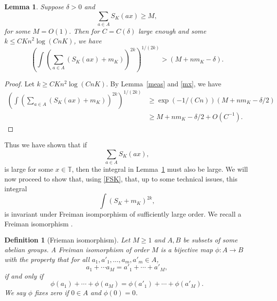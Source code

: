 \documentclass[12pt,reqno]{amsart}
\theoremstyle{dotless}
\newtheorem{lemma}{Lemma}
\newtheorem{defn}{Definition}
\begin{document}
\begin{lemma}\label{intSK} Suppose $\delta > 0$ and
$$\sum_{a \in A} S_K(ax) \geq M,$$
for some $M = O(1)$. Then for $C = C(\delta)$ large enough and some $k \leq  C Kn^2\log(CnK)$, we have $$ \left( \int \left( \sum_{a\in A} (S_K(ax) + m_K)\right)^{2k} \right)^{1/(2k)}  >  (M+nm_K-\delta).$$
\end{lemma}

\begin{proof}
Let $k \geq C Kn^2\log(CnK)$. By Lemma~\ref{meas} and \eqref{mx}, we have
\begin{align*} \label{int} \left( \int \left( \sum_{a\in A} (S_K(ax) + m_K)\right)^{2k} \right)^{1/(2k)} & \geq \exp(-1/(Cn)) (M + nm_K- \delta/2 ) \\
&\geq M+ nm_K-  \delta /2+ O(C^{-1}).\end{align*} 
\end{proof}


Thus we have shown that if 
$$\sum_{a \in A} S_K(ax),$$ is large for some $x \in \mathbb{T}$, then the integral in Lemma~\ref{intSK} must also be large. We will now proceed to show that, using \eqref{FSK}, that, up to some technical issues, this integral
$$\int (S_K +m_K)^{2k},$$ is invariant under Freiman isomporphism of sufficiently large order. We recall a Freiman isomorphism \cite[Definition 5.2.1]{TV}.
\begin{defn}[Frieman isomorphism] Let $M \geq 1$ and $A ,B$ be subsets of some abelian groups. A Freiman isomorphism of order $M$ is a bijective map $\phi : A \to B$ with the property that for all $a_1,a'_1 , \ldots ,a_m ,a'_m\in A$,
$$a_1 + \cdots a_M = a'_1 + \cdots + a'_M,$$
if and only if 
$$\phi(a_1) + \cdots + \phi(a_M) = \phi(a'_1) + \cdots + \phi(a'_M).$$
We say $\phi$ fixes zero if $0 \in A$ and $\phi(0) = 0$. 

\end{defn}
\end{document}

